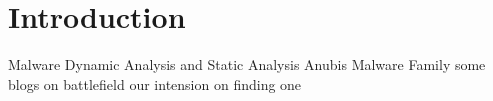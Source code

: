 \chapter{Introduction}\label{chapter:introduction}
	Malware
	Dynamic Analysis and Static Analysis
	Anubis \cite{anubis}
	Malware Family
	some blogs on battlefield
	our intension on finding one

